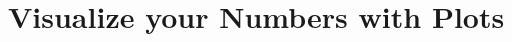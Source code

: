 \documentclass[aspectratio=169]{beamer}
\begin{document}
\section{Visualize your Numbers with \textbf{Plots}}

\begin{frame}
\end{frame}


\end{document}
